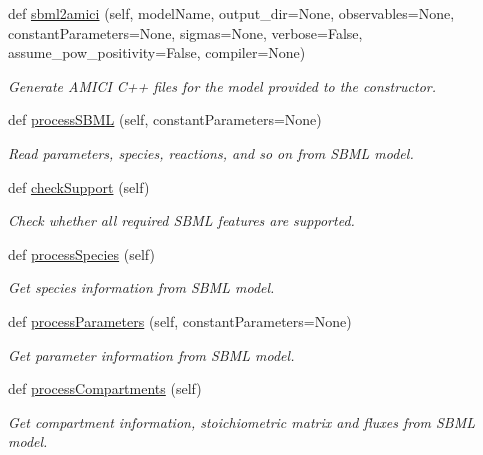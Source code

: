 \begin{DoxyCompactItemize}
def \mbox{\hyperlink{classamici_1_1sbml__import_1_1_sbml_importer_a83900bb62c0121eb798939a6d4232a9c}{sbml2amici}} (self, model\+Name, output\+\_\+dir=None, observables=None, constant\+Parameters=None, sigmas=None, verbose=False, assume\+\_\+pow\+\_\+positivity=False, compiler=None)
\begin{DoxyCompactList}\small\item\em Generate A\+M\+I\+CI C++ files for the model provided to the constructor. \end{DoxyCompactList}\item 
def \mbox{\hyperlink{classamici_1_1sbml__import_1_1_sbml_importer_ac188693ab1d9fc500d55748dbde9bf89}{process\+S\+B\+ML}} (self, constant\+Parameters=None)
\begin{DoxyCompactList}\small\item\em Read parameters, species, reactions, and so on from S\+B\+ML model. \end{DoxyCompactList}\item 
def \mbox{\hyperlink{classamici_1_1sbml__import_1_1_sbml_importer_ae9585f937c02f0618abeb06dd48bcd54}{check\+Support}} (self)
\begin{DoxyCompactList}\small\item\em Check whether all required S\+B\+ML features are supported. \end{DoxyCompactList}\item 
def \mbox{\hyperlink{classamici_1_1sbml__import_1_1_sbml_importer_a4912a89bf86ec8e0c1d9758b8090e327}{process\+Species}} (self)
\begin{DoxyCompactList}\small\item\em Get species information from S\+B\+ML model. \end{DoxyCompactList}\item 
def \mbox{\hyperlink{classamici_1_1sbml__import_1_1_sbml_importer_a26d072114efe1fec695cc4030c64e1ea}{process\+Parameters}} (self, constant\+Parameters=None)
\begin{DoxyCompactList}\small\item\em Get parameter information from S\+B\+ML model. \end{DoxyCompactList}\item 
def \mbox{\hyperlink{classamici_1_1sbml__import_1_1_sbml_importer_a526afc71a857e7fdefb4754fc2f93882}{process\+Compartments}} (self)
\begin{DoxyCompactList}\small\item\em Get compartment information, stoichiometric matrix and fluxes from S\+B\+ML model. \end{DoxyCompactList}\item 

\end{DoxyCompactItemize}
